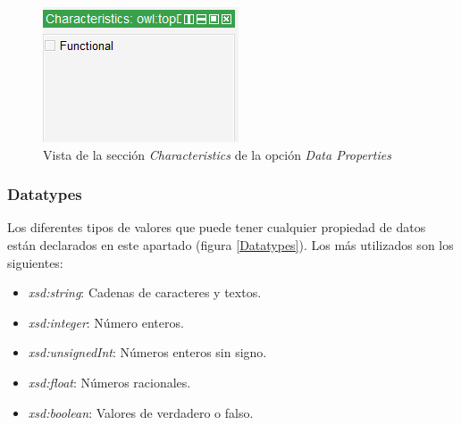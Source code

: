 \begin{figure}[ht]
    \centering
    \includegraphics[scale=0.8]{Figures/Protege/DataProperties_characteristics.png}
    \caption{Vista de la sección \textit{Characteristics} de la opción \textit{Data Properties}}
    \label{DataProperties_characteristics}
\end{figure}

\subsubsection{Datatypes}
Los diferentes tipos de valores que puede tener cualquier propiedad de datos están declarados en este apartado (figura \ref*{Datatypes}).
Los más utilizados son los siguientes:
\begin{itemize}
    \item \textit{xsd:string}: Cadenas de caracteres y textos.
    \item \textit{xsd:integer}: Número enteros.
    \item \textit{xsd:unsignedInt}: Números enteros sin signo.
    \item \textit{xsd:float}: Números racionales.
    \item \textit{xsd:boolean}: Valores de verdadero o falso.
\end{itemize}


